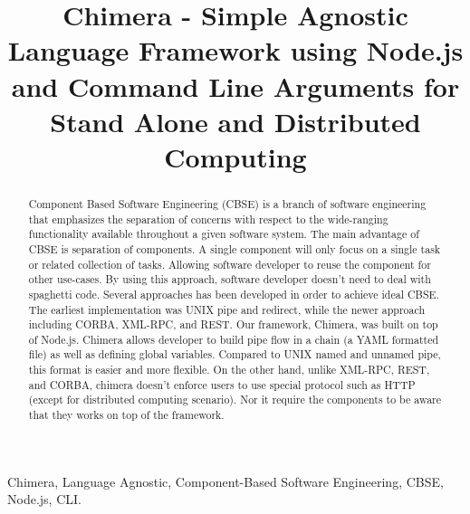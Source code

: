\documentclass[conference]{IEEEtran}
\begin{document}
\title{Chimera - Simple Agnostic Language Framework using Node.js and Command Line 
Arguments for Stand Alone and Distributed Computing}

\author{
\and
{}
\and
{}
}

\maketitle


\begin{abstract}
Component Based Software Engineering (CBSE) is a branch of software 
engineering that emphasizes the separation of concerns with respect to the 
wide-ranging functionality available throughout a given software system.  The 
main advantage of CBSE is separation of components. A single component will 
only focus on a single task or related collection of tasks. Allowing software 
developer to reuse the component for other use-cases. By using this approach, 
software developer doesn't need to deal with spaghetti code. Several 
approaches has been developed in order to achieve ideal CBSE. The earliest 
implementation was UNIX pipe and redirect, while the newer approach including 
CORBA, XML-RPC, and REST. Our framework, Chimera, was built on top of Node.js. 
Chimera allows developer to build pipe flow in a chain (a YAML formatted file) 
as well as defining global variables. Compared to UNIX named and unnamed pipe, 
this format is easier and more flexible. On the other hand, unlike XML-RPC, 
REST, and CORBA, chimera doesn't enforce users to use special protocol such as 
HTTP (except for distributed computing scenario). Nor it require the components
to be aware that they works on top of the framework.
\end{abstract}

\begin{IEEEkeywords}
Chimera, Language Agnostic, Component-Based Software Engineering, CBSE, Node.js, CLI.
\end{IEEEkeywords}
\end{document}
